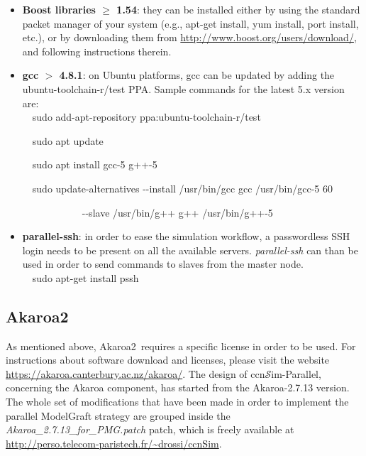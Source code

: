 \documentclass[10pt]{article}
\newcommand{\ccnsim}{ccn\ensuremath{\mathcal{S}}im} %
\newcommand{\akaroa}{Akaroa2\textcopyright\ }
\newcommand{\colorboxg}[1]{{\colorbox{gray!20}{#1}}}
\begin{document}
 \begin{itemize}
     \item \textbf{Boost libraries $\ge$ 1.54}: they can be installed either by using the standard packet manager of your system (e.g., apt-get install, yum install, port install, etc.), or by downloading them from \url{http://www.boost.org/users/download/}, and following instructions therein.

     \item \textbf{gcc $>$ 4.8.1}: on Ubuntu platforms, gcc can be updated by adding the \colorboxg{ubuntu-toolchain-r/test} PPA. Sample commands for the latest 5.x version are: \\ 

     \ \ \colorboxg{sudo add-apt-repository ppa:ubuntu-toolchain-r/test} 

     \ \ \colorboxg{sudo apt update} 

     \ \ \colorboxg{sudo apt install gcc-5 g++-5} 
     
     \ \ \colorboxg{sudo update-alternatives -{}-install /usr/bin/gcc gcc /usr/bin/gcc-5 60}

     \ \ \ \ \ \ \ \ \ \ \ \ \colorboxg{-{}-slave /usr/bin/g++ g++ /usr/bin/g++-5}  \\

     \item \textbf{parallel-ssh}: in order to ease the simulation workflow, a passwordless SSH login needs to be present on all the available servers. \emph{parallel-ssh} can than be used in order to send commands to slaves from the master node. \\

     \ \ \colorboxg{sudo apt-get install pssh} 
\end{itemize}

\subsection*{\akaroa}
As mentioned above, \akaroa requires a specific license in order to be used. 
For instructions about software download and licenses, please visit the website \url{https://akaroa.canterbury.ac.nz/akaroa/}.
The design of \ccnsim-Parallel, concerning the Akaroa component, has started from the Akaroa-2.7.13 version. 
The whole set of modifications that have been made in order to implement the parallel ModelGraft strategy are grouped inside the \emph{Akaroa\_2.7.13\_for\_PMG.patch} patch, which is freely available at \url{http://perso.telecom-paristech.fr/~drossi/ccnSim}.
\end{document}
